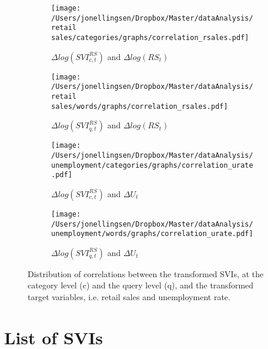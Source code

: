 \begin{figure}[H]
\centering
    \begin{subfigure}[b]{0.45\textwidth}
\caption{$\Delta log(SVI_{c,t}^{RS})$ and $\Delta log(RS_t)$}
        \texttt{[image: /Users/jonellingsen/Dropbox/Master/dataAnalysis/retail sales/categories/graphs/correlation\_rsales.pdf]}
    \end{subfigure}
    \begin{subfigure}[b]{0.45\textwidth}
\caption{$\Delta log(SVI_{q,t}^{RS})$ and $\Delta log(RS_t)$}
        \texttt{[image: /Users/jonellingsen/Dropbox/Master/dataAnalysis/retail sales/words/graphs/correlation\_rsales.pdf]}
    \end{subfigure}
\begin{subfigure}[b]{0.45\textwidth}
 \caption{$\Delta log(SVI_{c,t}^{RS})$ and $\Delta U_t$}        
\texttt{[image: /Users/jonellingsen/Dropbox/Master/dataAnalysis/unemployment/categories/graphs/correlation\_urate.pdf]}
    \end{subfigure}
\begin{subfigure}[b]{0.45\textwidth}
\caption{$\Delta log(SVI_{q,t}^{RS})$ and $\Delta U_t$}        
\texttt{[image: /Users/jonellingsen/Dropbox/Master/dataAnalysis/unemployment/words/graphs/correlation\_urate.pdf]}
    \end{subfigure}
    \caption{Distribution of correlations between the transformed SVIs, at the category level (c) and the query level (q), and the transformed target variables, i.e. retail sales and unemployment rate.}
	\label{fig:correlation_target}
\end{figure}
\newpage
\section{List of SVIs}\label{svi_list}

